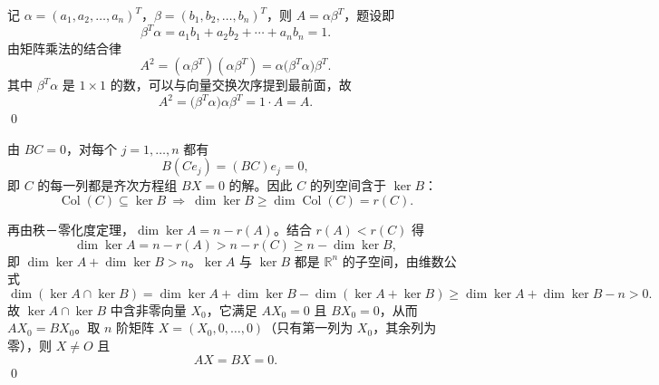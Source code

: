 \begin{solution}
记 $\alpha=(a_1,a_2,\dots,a_n)^{T}$，$\beta=(b_1,b_2,\dots,b_n)^{T}$，则 $A=\alpha\beta^{T}$，题设即
\[
\beta^{T}\alpha=a_1b_1+a_2b_2+\cdots+a_nb_n=1 .
\]
由矩阵乘法的结合律
\[
A^{2}=(\alpha\beta^{T})(\alpha\beta^{T})=\alpha\bigl(\beta^{T}\alpha\bigr)\beta^{T}.
\]
其中 $\beta^{T}\alpha$ 是 $1\times1$ 的数，可以与向量交换次序提到最前面，故
\[
A^{2}=\bigl(\beta^{T}\alpha\bigr)\alpha\beta^{T}=1\cdot A=A .
\]
\qed
\end{solution}

\begin{solution}
由 $BC=0$，对每个 $j=1,\dots,n$ 都有
\[
B(Ce_j)=(BC)e_j=0,
\]
即 $C$ 的每一列都是齐次方程组 $BX=0$ 的解。因此 $C$ 的列空间含于 $\ker B$：
\[
\operatorname{Col}(C)\subseteq\ker B\ \Longrightarrow\ \dim\ker B\ge\dim\operatorname{Col}(C)=r(C).
\]

再由秩－零化度定理，$\dim\ker A=n-r(A)$。结合 $r(A)<r(C)$ 得
\[
\dim\ker A=n-r(A)>n-r(C)\ge n-\dim\ker B,
\]
即 $\dim\ker A+\dim\ker B>n$。$\ker A$ 与 $\ker B$ 都是 $\mathbb R^{n}$ 的子空间，由维数公式
\[
\dim(\ker A\cap\ker B)=\dim\ker A+\dim\ker B-\dim(\ker A+\ker B)
\ge\dim\ker A+\dim\ker B-n>0 .
\]
故 $\ker A\cap\ker B$ 中含非零向量 $X_0$，它满足 $AX_0=0$ 且 $BX_0=0$，从而 $AX_0=BX_0$。取 $n$ 阶矩阵 $X=(X_0,0,\dots,0)$（只有第一列为 $X_0$，其余列为零），则 $X\ne O$ 且
\[
AX=BX=0 .
\]
\qed
{}
\end{solution}
